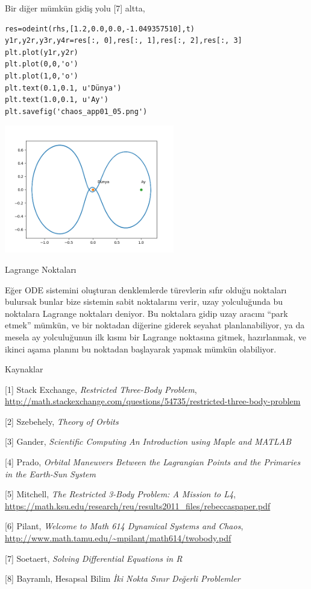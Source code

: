 \documentclass[12pt,fleqn]{article}\usepackage{../../common}
\begin{document}
Bir diğer mümkün gidiş yolu [7] altta,

\begin{verbatim}
res=odeint(rhs,[1.2,0.0,0.0,-1.049357510],t)
y1r,y2r,y3r,y4r=res[:, 0],res[:, 1],res[:, 2],res[:, 3]
plt.plot(y1r,y2r)
plt.plot(0,0,'o')
plt.plot(1,0,'o')
plt.text(0.1,0.1, u'Dünya')
plt.text(1.0,0.1, u'Ay')
plt.savefig('chaos_app01_05.png')
\end{verbatim}

\includegraphics[width=20em]{chaos_app01_05.png}

Lagrange Noktaları 

Eğer ODE sistemini oluşturan denklemlerde türevlerin sıfır olduğu noktaları
bulursak bunlar bize sistemin sabit noktalarını verir, uzay yolculuğunda bu
noktalara Lagrange noktaları deniyor. Bu noktalara gidip uzay aracını
``park etmek'' mümkün, ve bir noktadan diğerine giderek seyahat
planlanabiliyor, ya da mesela ay yolculuğunun ilk kısmı bir Lagrange
noktasına gitmek, hazırlanmak, ve ikinci aşama planını bu noktadan
başlayarak yapmak mümkün olabiliyor.

Kaynaklar

[1] Stack Exchange, {\em Restricted Three-Body Problem}, \url{http://math.stackexchange.com/questions/54735/restricted-three-body-problem}

[2] Szebehely, {\em Theory of Orbits}

[3] Gander, {\em Scientific Computing An Introduction using Maple and MATLAB}

[4] Prado, {\em Orbital Maneuvers Between the Lagrangian Points and the Primaries in the Earth-Sun System}

[5] Mitchell, {\em The Restricted 3-Body Problem: A Mission to L4}, \url{https://math.ksu.edu/research/reu/results2011_files/rebeccaspaper.pdf}

[6] Pilant, {\em Welcome to Math 614  Dynamical Systems and Chaos}, \url{http://www.math.tamu.edu/~mpilant/math614/twobody.pdf}

[7] Soetaert, {\em Solving Differential Equations in R}

[8] Bayramlı, Hesapsal Bilim {\em İki Nokta  Sınır Değerli Problemler}
\end{document}
